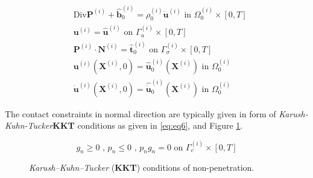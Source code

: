 \documentclass[a4paper,10pt]{article} %
\begin{document}
\begin{subequations}\label{eq:eq0}
    \begin{align}
        & \text{Div} \mathbf{P}^{(i)}+\hat{\mathbf{b}}_0^{(i)}=\rho_0^{(i)}\ddot{\mathbf{u}}^{(i)} \text{ in } \Omega_0^{(i)} \times [0, T] \label{eq:subeq1}\\
        & \mathbf{u}^{(i)} = \hat{\mathbf{u}}^{(i)} \text{ on } \Gamma_u^{(i)} \times [0, T] \label{eq:subeq2}\\
        & \mathbf{P}^{(i)} \cdot \mathbf{N}^{(i)} = \hat{\mathbf{t}}_0^{(i)} \text{ on } \Gamma_\sigma^{(i)} \times [0, T] \label{eq:subeq3} \\
        & \mathbf{u}^{(i)}\left( \mathbf{X}^{(i)}, 0\right) = \hat{\mathbf{u}}_0^{(i)}\left( \mathbf{X}^{(i)}\right) \text{ in } \Omega_0^{(i)} \label{eq:subeq4} \\
        & \dot{\mathbf{u}}^{(i)}\left( \mathbf{X}^{(i)}, 0\right) = \hat{\dot{\mathbf{u}}}_0^{(i)}\left( \mathbf{X}^{(i)}\right) \text{ in } \Omega_0^{(i)} \label{eq:subeq5}
    \end{align}
\end{subequations}

The contact constraints in normal direction are typically given in form of \textit{Karush-Kuhn-Tucker}\textbf{KKT} conditions as given in \eqref{eq:eq6}, and Figure \ref{fig:kkt}.
 
 \begin{equation}\label{eq:eq6}
g_n \geq 0 \text{ , } p_n \leq 0 \text{ , } p_n g_n = 0 \text{ on } \Gamma_c^{(i)} \times [0, T]
 \end{equation}

\begin{figure}[h]
\begin{center}
\caption{\textit{Karush–Kuhn–Tucker} (\textbf{KKT}) conditions of non-penetration.}
\label{fig:kkt}
\end{center}
\end{figure}
\end{document}
